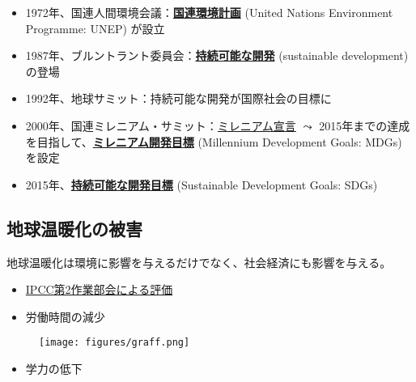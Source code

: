 \documentclass[
  xelatex,
  ja=standard]{bxjsarticle}
\providecommand{\tightlist}{%
  \setlength{\itemsep}{0pt}\setlength{\parskip}{0pt}}\usepackage{longtable,booktabs,array}
\begin{document}
\begin{itemize}
\tightlist
\item
  1972年、国連人間環境会議：\href{https://www.mofa.go.jp/mofaj/gaiko/kankyo/kikan/unep.html}{\textbf{国連環境計画}}
  (United Nations Environment Programme: UNEP) が設立
\item
  1987年、ブルントラント委員会：\href{https://www.unic.or.jp/activities/economic_social_development/sustainable_development/}{\textbf{持続可能な開発}}
  (sustainable development) の登場
\item
  1992年、地球サミット：持続可能な開発が国際社会の目標に
\item
  2000年、国連ミレニアム・サミット：\href{https://www.mofa.go.jp/mofaj/kaidan/kiroku/s_mori/arc_00/m_summit/sengen.html}{ミレニアム宣言}
  \(\leadsto\)
  2015年までの達成を目指して、\href{https://www.un.org/millenniumgoals/2015_MDG_Report/pdf/MDG\%202015\%20PC\%20final.pdf}{\textbf{ミレニアム開発目標}}
  (Millennium Development Goals: MDGs) を設定
\item
  2015年、\href{https://www.mofa.go.jp/mofaj/gaiko/oda/sdgs/index.html}{\textbf{持続可能な開発目標}}
  (Sustainable Development Goals: SDGs)
\end{itemize}

\hypertarget{ux5730ux7403ux6e29ux6696ux5316ux306eux88abux5bb3}{%
\subsection{地球温暖化の被害}\label{ux5730ux7403ux6e29ux6696ux5316ux306eux88abux5bb3}}

地球温暖化は環境に影響を与えるだけでなく、社会経済にも影響を与える。

\begin{itemize}
\tightlist
\item
  \href{https://www.env.go.jp/earth/ipcc/6th/index.html}{IPCC第2作業部会による評価}
\item
  労働時間の減少\citep{graff2014}
\end{itemize}

\begin{figure}[htpb]

{\centering \texttt{[image: figures/graff.png]}

}

\caption{\citet{graff2014}}

\end{figure}

\begin{itemize}
\tightlist
\item
  学力の低下\citep{park2020}
\end{itemize}
\end{document}

